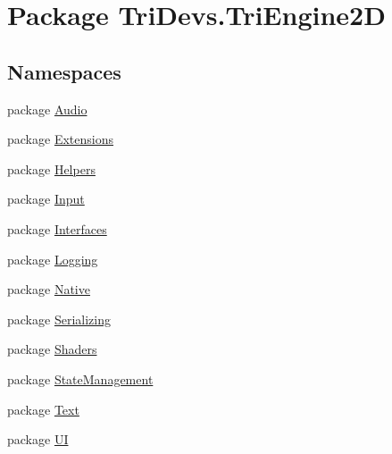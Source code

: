 \hypertarget{namespace_tri_devs_1_1_tri_engine2_d}{\section{Package Tri\-Devs.\-Tri\-Engine2\-D}
\label{namespace_tri_devs_1_1_tri_engine2_d}
}
\subsection*{Namespaces}
\begin{DoxyCompactItemize}
\item 
package \hyperlink{namespace_tri_devs_1_1_tri_engine2_d_1_1_audio}{Audio}
\item 
package \hyperlink{namespace_tri_devs_1_1_tri_engine2_d_1_1_extensions}{Extensions}
\item 
package \hyperlink{namespace_tri_devs_1_1_tri_engine2_d_1_1_helpers}{Helpers}
\item 
package \hyperlink{namespace_tri_devs_1_1_tri_engine2_d_1_1_input}{Input}
\item 
package \hyperlink{namespace_tri_devs_1_1_tri_engine2_d_1_1_interfaces}{Interfaces}
\item 
package \hyperlink{namespace_tri_devs_1_1_tri_engine2_d_1_1_logging}{Logging}
\item 
package \hyperlink{namespace_tri_devs_1_1_tri_engine2_d_1_1_native}{Native}
\item 
package \hyperlink{namespace_tri_devs_1_1_tri_engine2_d_1_1_serializing}{Serializing}
\item 
package \hyperlink{namespace_tri_devs_1_1_tri_engine2_d_1_1_shaders}{Shaders}
\item 
package \hyperlink{namespace_tri_devs_1_1_tri_engine2_d_1_1_state_management}{State\-Management}
\item 
package \hyperlink{namespace_tri_devs_1_1_tri_engine2_d_1_1_text}{Text}
\item 
package \hyperlink{namespace_tri_devs_1_1_tri_engine2_d_1_1_u_i}{U\-I}
\end{DoxyCompactItemize}
